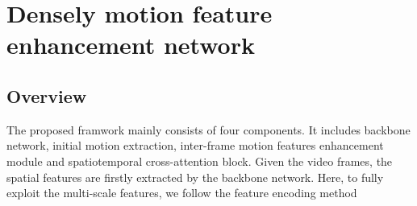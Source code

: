 \documentclass[12pt]{article}
\begin{document}
\section{Densely motion feature enhancement network}

\subsection{Overview}

The proposed framwork mainly consists of four components. It includes backbone network, initial motion extraction, inter-frame motion features enhancement module and spatiotemporal cross-attention block. Given the video frames, the spatial features are firstly extracted by the backbone network. Here, to fully exploit the multi-scale features, we follow the feature encoding method \cite{fu2019dual}
\end{document}
